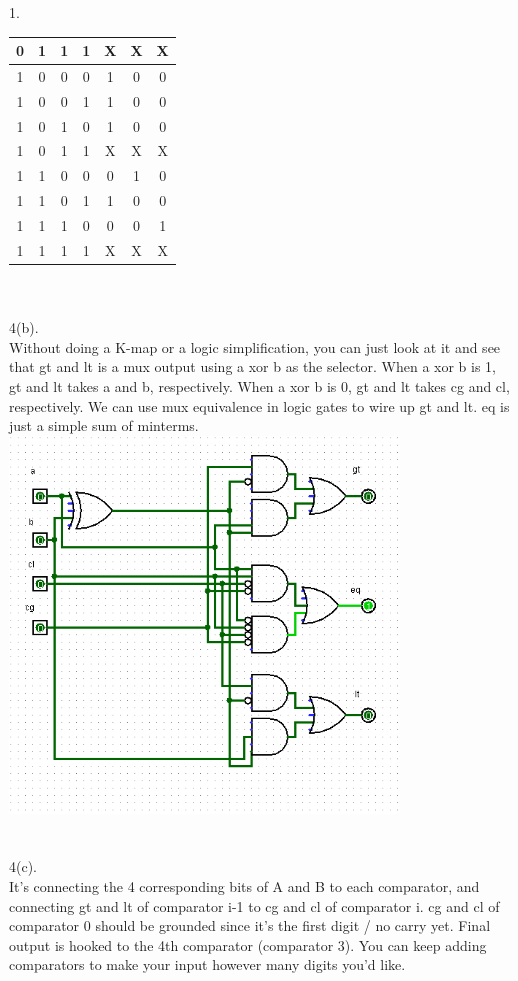\documentclass[a4paper, 20pt]{article}
\begin{document}
\begin{question}{1.}
\begin{tabular}{c c c c | c c c}
    0 & 1 & 1 & 1 & X & X & X \\
    \hline
    1 & 0 & 0 & 0 & 1 & 0 & 0 \\
    1 & 0 & 0 & 1 & 1 & 0 & 0 \\
    1 & 0 & 1 & 0 & 1 & 0 & 0 \\
    1 & 0 & 1 & 1 & X & X & X \\
    \hline
    1 & 1 & 0 & 0 & 0 & 1 & 0 \\
    1 & 1 & 0 & 1 & 1 & 0 & 0 \\
    1 & 1 & 1 & 0 & 0 & 0 & 1 \\
    1 & 1 & 1 & 1 & X & X & X \\
  \end{tabular}
  
  \\
\\4(b).
\\ Without doing a K-map or a logic simplification, you can just look at it and see that gt and lt is a mux output using a xor b as the selector. When a xor b is 1, gt and lt takes a and b, respectively. When a xor b is 0, gt and lt takes cg and cl, respectively. We can use mux equivalence in logic gates to wire up gt and lt. eq is just a simple sum of minterms. 
\\
 \includegraphics[height=10cm]{4b.png} \\
 \\
\\ 4(c).
\\ It's connecting the 4 corresponding bits of A and B to each comparator, and connecting gt and lt of comparator i-1 to cg and cl of comparator i. cg and cl of comparator 0 should be grounded since it's the first digit / no carry yet. Final output is hooked to the 4th comparator (comparator 3). You can keep adding comparators to make your input however many digits you'd like.

\end{question}
\end{document}
